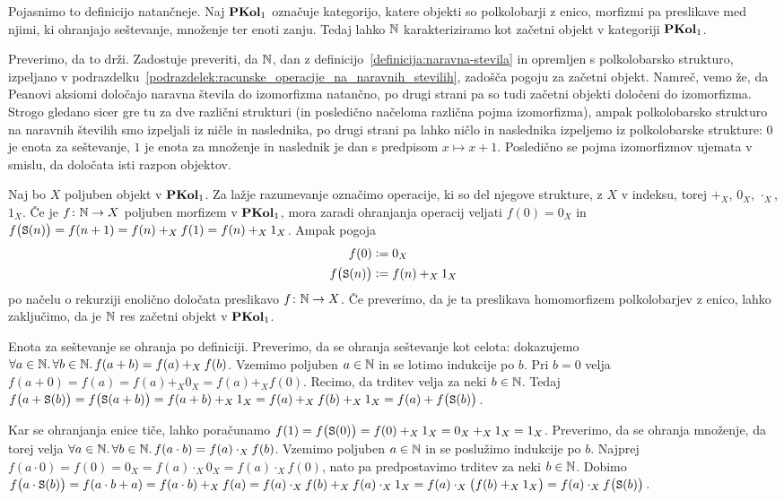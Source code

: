 Pojasnimo to definicijo natančneje. Naj $\mathbf{PKol}_1$ označuje kategorijo, katere objekti so polkolobarji z enico, morfizmi pa preslikave med njimi, ki ohranjajo seštevanje, množenje ter enoti zanju. Tedaj lahko $\mathbb{N}$ karakteriziramo kot začetni objekt v kategoriji $\mathbf{PKol}_1$.

Preverimo, da to drži. Zadostuje preveriti, da $\mathbb{N}$, dan z definicijo~\ref{definicija:naravna-stevila} in opremljen s polkolobarsko strukturo, izpeljano v podrazdelku~\ref{podrazdelek:racunske_operacije_na_naravnih_stevilih}, zadošča pogoju za začetni objekt. Namreč, vemo že, da Peanovi aksiomi določajo naravna števila do izomorfizma natančno, po drugi strani pa so tudi začetni objekti določeni do izomorfizma. Strogo gledano sicer gre tu za dve različni strukturi (in posledično načeloma različna pojma izomorfizma), ampak polkolobarsko strukturo na naravnih številih smo izpeljali iz ničle in naslednika, po drugi strani pa lahko ničlo in naslednika izpeljemo iz polkolobarske strukture: $0$ je enota za seštevanje, $1$ je enota za množenje in naslednik je dan s predpisom $x \mapsto x + 1$. Posledično se pojma izomorfizmov ujemata v smislu, da določata isti razpon objektov.

Naj bo $X$ poljuben objekt v $\mathbf{PKol}_1$. Za lažje razumevanje označimo operacije, ki so del njegove strukture, z $X$ v indeksu, torej $+_X$, $0_X$, $\cdot_X$, $1_X$. Če je $f\colon \mathbb{N} \to X$ poljuben morfizem v $\mathbf{PKol}_1$, mora zaradi ohranjanja operacij veljati $f(0) = 0_X$ in $f\big(\mathtt{S}(n)\big) = f(n + 1) = f(n) +_X f(1) = f(n) +_X 1_X$. Ampak pogoja
\begin{align*}
f(0) &\mathrel{\mathop:}= 0_X \\
f\big(\mathtt{S}(n)\big) &\mathrel{\mathop:}= f(n) +_X 1_X
\end{align*}
po načelu o rekurziji enolično določata preslikavo $f\colon \mathbb{N} \to X$. Če preverimo, da je ta preslikava homomorfizem polkolobarjev z enico, lahko zaključimo, da je $\mathbb{N}$ res začetni objekt v $\mathbf{PKol}_1$.

Enota za seštevanje se ohranja po definiciji. Preverimo, da se ohranja seštevanje kot celota: dokazujemo $\forall a \in \mathbb{N} .\,\forall b \in \mathbb{N} .\,{f(a + b) = f(a) +_X f(b)}$. Vzemimo poljuben $a \in \mathbb{N}$ in se lotimo indukcije po $b$. Pri $b = 0$ velja $f(a + 0) = f(a) = f(a) +_X 0_X = f(a) +_X f(0)$. Recimo, da trditev velja za neki $b \in \mathbb{N}$. Tedaj $f\big(a + \mathtt{S}(b)\big) = f\big(\mathtt{S}(a + b)\big) = f(a + b) +_X 1_X = f(a) +_X f(b) +_X 1_X = f(a) + f\big(\mathtt{S}(b)\big)$.

Kar se ohranjanja enice tiče, lahko poračunamo $f(1) = f\big(\mathtt{S}(0)\big) = f(0) +_X 1_X = 0_X +_X 1_X = 1_X$. Preverimo, da se ohranja množenje, da torej velja $\forall a \in \mathbb{N} .\,\forall b \in \mathbb{N} .\,{f(a \cdot b) = f(a) \cdot_X f(b)}$. Vzemimo poljuben $a \in \mathbb{N}$ in se poslužimo indukcije po $b$. Najprej $f(a \cdot 0) = f(0) = 0_X = f(a) \cdot_X 0_X = f(a) \cdot_X f(0)$, nato pa predpostavimo trditev za neki $b \in \mathbb{N}$. Dobimo $f\big(a \cdot \mathtt{S}(b)\big) = f(a \cdot b + a) = f(a \cdot b) +_X f(a) = f(a) \cdot_X f(b) +_X f(a) \cdot_X 1_X = f(a) \cdot_X \big(f(b) +_X 1_X\big) = f(a) \cdot_X f\big(\mathtt{S}(b)\big)$.

